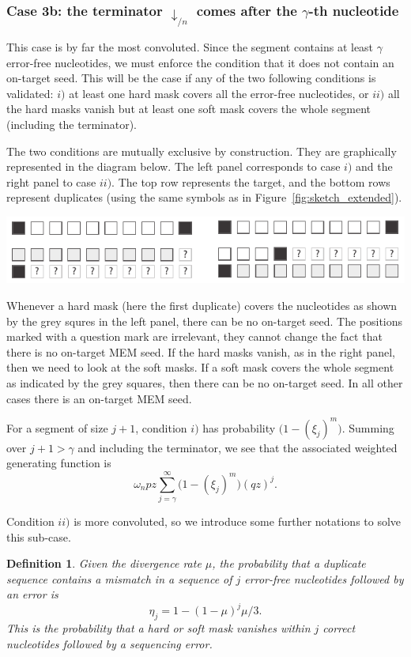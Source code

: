 \documentclass{article}
\newtheorem{definition}{Definition}
\newenvironment{inset}
{\vspace{0.5\baselineskip}\begin{center}}
{\end{center}\vspace{0.5\baselineskip}}
\begin{document}
\subsubsection*{Case 3b: the terminator $\downarrow_{/n}$ comes after the
$\gamma$-th nucleotide}

This case is by far the most convoluted. Since the segment contains at
least $\gamma$ error-free nucleotides, we must enforce the condition that
it does not contain an on-target seed. This will be the case if any of the
two following conditions is validated: $i)$ at least one hard mask covers
all the error-free nucleotides, or $ii)$ all the hard masks vanish but at
least one soft mask covers the whole segment (including the terminator).

The two conditions are mutually exclusive by construction. They are
graphically represented in the diagram below. The left panel corresponds
to case $i)$ and the right panel to case $ii)$. The top row represents the
target, and the bottom rows represent duplicates (using the same symbols
as in Figure~\ref{fig:sketch_extended}).
\begin{inset}
\includegraphics{masks.pdf}
\end{inset}

Whenever a hard mask (here the first duplicate) covers the nucleotides as
shown by the grey squres in the left panel, there can be no on-target
seed. The positions marked with a question mark are irrelevant, they
cannot change the fact that there is no on-target MEM seed. If the hard
masks vanish, as in the right panel, then we need to look at the soft
masks. If a soft mask covers the whole segment as indicated by the grey
squares, then there can be no on-target seed. In all other cases there is
an on-target MEM seed.

For a segment of size $j+1$, condition $i)$ has probability $\big(1 -
(\xi_j)^m \big)$. Summing over $j+1 > \gamma$ and including the
terminator, we see that the associated weighted generating function is
\begin{equation*}
\omega_n pz \sum_{j=\gamma}^\infty \Big(1 - (\xi_j)^m \Big) (qz)^j.
\end{equation*}

Condition $ii)$ is more convoluted, so we introduce some further
notations to solve this sub-case.
\begin{definition}
Given the divergence rate $\mu$, the probability that a duplicate sequence
contains a mismatch in a sequence of $j$ error-free nucleotides followed
by an error is
\begin{equation}
\label{eq:eta}
\eta_j = 1-(1-\mu)^j\mu/3.
\end{equation}
This is the probability that a hard or soft mask vanishes within $j$
correct nucleotides followed by a sequencing error.
\end{definition}
\end{document}
